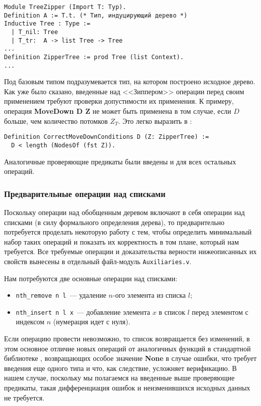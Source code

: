 \begin{Verbatim}[fontsize=\small]
Module TreeZipper (Import T: Typ).
Definition A := T.t. (* Тип, индуцирующий дерево *)
Inductive Tree : Type :=
  | T_nil: Tree
  | T_tr:  A -> list Tree -> Tree
...
Definition ZipperTree := prod Tree (list Context).
...
\end{Verbatim}

Под базовым типом подразумевается тип, на котором построено исходное дерево. Как уже было сказано, введенные над <<Зиппером>> операции перед своим применением требуют проверки допустимости их применения. К примеру, операция \textbf{MoveDown D Z} не может быть применена в том случае, если $D$ больше, чем количество потомков $Z_T$. Это легко выразить в \tcoq:
\begin{Verbatim}[fontsize=\small]
Definition CorrectMoveDownConditions D (Z: ZipperTree) :=
  D < length (NodesOf (fst Z)).
\end{Verbatim}
Аналогичные проверяющие предикаты были введены и для всех остальных операций.

\subsubsection{Предварительные операции над списками}

Поскольку операции над обобщенным деревом включают в себя операции над списками (в силу формального определения дерева), то предварительно потребуется проделать некоторую работу с тем, чтобы определить минимальный набор таких операций и показать их корректность в том плане, который нам требуется. Все требуемые операции и доказательства верности нижеописанных их свойств вынесены в отдельный файл-модуль \texttt{Auxiliaries.v}.

Нам потребуются две основные операции над списками:
\begin{itemize}
\item \texttt{nth\_remove n l}~--- удаление $n$-ого элемента из списка $l$;
\item \texttt{nth\_insert n l x}~--- добавление элемента $x$ в список $l$ перед элементом с индексом $n$ (нумерация идет с нуля).
\end{itemize}

Если операцию провести невозможно, то список возвращается без изменений, в этом основное отличие новых операций от аналогичных функций в стандартной библиотеке \tcoq, возвращающих особое значение \textbf{None} в случае ошибки, что требует введения еще одного типа и что, как следствие, усложняет верификацию. В нашем случае, поскольку мы полагаемся на введенные выше проверяющие предикаты, такая дифференциация ошибок и неизменившихся исходных данных не требуется.

